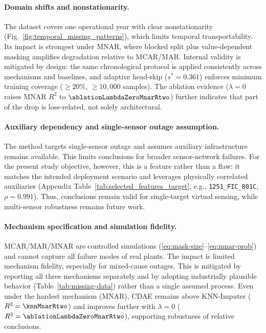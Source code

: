 \paragraph{Domain shifts and nonstationarity.}
The dataset covers one operational year with clear nonstationarity (Fig.~\ref{fig:temporal_missing_patterns}), which limits temporal transportability. Its impact is strongest under MNAR, where blocked split plus value-dependent masking amplifies degradation relative to MCAR/MAR. Internal validity is mitigated by design: the same chronological protocol is applied consistently across mechanisms and baselines, and adaptive head-skip ($s^*=0.361$) enforces minimum training coverage ($\ge 20\%$, $\ge 10{,}000$ samples). The ablation evidence ($\lambda{=}0$ raises MNAR $R^2$ to $\ablationLambdaZeroMnarRtwo$) further indicates that part of the drop is loss-related, not solely architectural.

\paragraph{Auxiliary dependency and single-sensor outage assumption.}
The method targets single-sensor outage and assumes auxiliary infrastructure remains available. This limits conclusions for broader sensor-network failures. For the present study objective, however, this is a feature rather than a flaw: it matches the intended deployment scenario and leverages physically correlated auxiliaries (Appendix Table~\ref{tab:selected_features_target}, e.g., \texttt{1251\_FIC\_801C}, $\rho=0.991$). Thus, conclusions remain valid for single-target virtual sensing, while multi-sensor robustness remains future work.

\paragraph{Mechanism specification and simulation fidelity.}
MCAR/MAR/MNAR are controlled simulations (\eqref{eq:mask-size}--\eqref{eq:mnar-prob}) and cannot capture all failure modes of real plants. The impact is limited mechanism fidelity, especially for mixed-cause outages. This is mitigated by reporting all three mechanisms separately and by adopting industrially plausible behavior (Table~\ref{tab:missing-data}) rather than a single assumed process. Even under the hardest mechanism (MNAR), CDAE remains above KNN-Imputer ($R^2=\knnMnarRtwo$) and improves further with $\lambda{=}0$ ($R^2=\ablationLambdaZeroMnarRtwo$), supporting robustness of relative conclusions.

